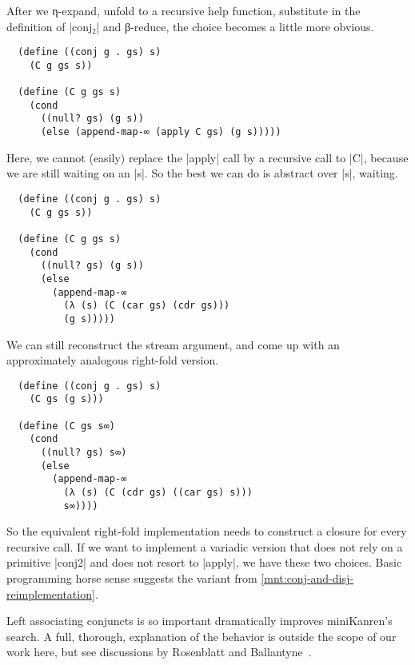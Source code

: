 \documentclass[sigplan,screen,draft,anonymous,review,natbib=false]{acmart}
\begin{document}
After we η-expand, unfold to a recursive help function, substitute in
the definition of \rackinline|conj₂| and β-reduce, the choice becomes
a little more obvious.

\begin{verbatim}
  (define ((conj g . gs) s)
    (C g gs s))

  (define (C g gs s)
    (cond
      ((null? gs) (g s))
      (else (append-map-∞ (apply C gs) (g s)))))
\end{verbatim}

Here, we cannot (easily) replace the \rackinline|apply| call by a
recursive call to \rackinline|C|, because we are still waiting on an
\rackinline|s|. So the best we can do is abstract over \rackinline|s|,
waiting.

\begin{verbatim}
  (define ((conj g . gs) s)
    (C g gs s))

  (define (C g gs s)
    (cond
      ((null? gs) (g s))
      (else
        (append-map-∞
          (λ (s) (C (car gs) (cdr gs)))
          (g s)))))
\end{verbatim}

We can still reconstruct the stream argument, and come up with an approximately analogous right-fold version.

\begin{verbatim}
  (define ((conj g . gs) s)
    (C gs (g s)))

  (define (C gs s∞)
    (cond
      ((null? gs) s∞)
      (else
        (append-map-∞
          (λ (s) (C (cdr gs) ((car gs) s)))
          s∞))))
\end{verbatim}

So the equivalent right-fold implementation needs to construct a
closure for every recursive call. If we want to implement a variadic
version that does not rely on a primitive \rackinline|conj2| and does
not resort to \rackinline|apply|, we have these two choices. Basic
programming horse sense suggests the variant from
\cref{mnt:conj-and-disj-reimplementation}.

Left associating conjuncts is so important dramatically improves
miniKanren's search. A full, thorough, explanation of the behavior is
outside the scope of our work here, but see discussions by Rosenblatt
and Ballantyne~\cite{here,nowhere}.

\end{document}
